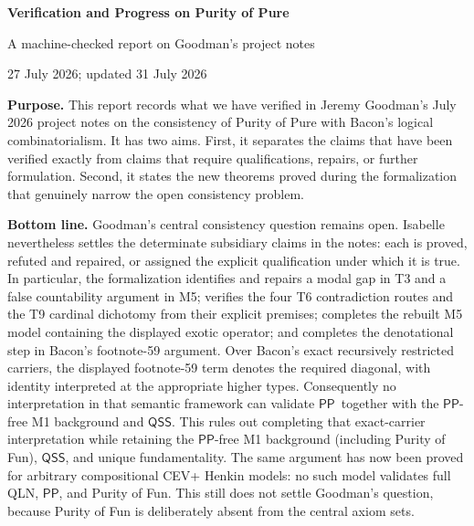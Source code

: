 \documentclass[12pt,leqno]{article}
\theoremstyle{plain}
\theoremstyle{definition}
\newcommand{\PP}{\ensuremath{\mathsf{PP}}}
\newcommand{\QSS}{\ensuremath{\mathsf{QSS}}}
\begin{document}
\begin{center}
{\Large\bfseries Verification and Progress on Purity of Pure\par}
\vspace{4pt}
{\large A machine-checked report on Goodman's project notes\par}
\vspace{8pt}
{\normalsize 27 July 2026; updated 31 July 2026}
\end{center}

\bigskip

\noindent\textbf{Purpose.}
This report records what we have verified in Jeremy Goodman's July 2026
project notes on the consistency of Purity of Pure with Bacon's logical
combinatorialism.  It has two aims.  First, it separates the claims that have
been verified exactly from claims that require qualifications, repairs, or
further formulation.  Second, it states the new theorems proved during the
formalization that genuinely narrow the open consistency problem.

\medskip

\noindent\textbf{Bottom line.}
Goodman's central consistency question remains open.  Isabelle nevertheless
settles the determinate subsidiary claims in the notes: each is proved,
refuted and repaired, or assigned the explicit qualification under which it
is true.  In particular, the formalization identifies and repairs a modal gap
in T3 and a false countability argument in M5; verifies the four T6
contradiction routes and the T9 cardinal dichotomy from their explicit
premises; completes the rebuilt M5 model containing the displayed exotic
operator; and completes the denotational step in Bacon's footnote-59
argument.  Over Bacon's exact recursively restricted carriers, the displayed footnote-59 term
denotes the required diagonal, with identity interpreted at the appropriate
higher types.  Consequently no interpretation in that semantic framework
can validate \PP\ together with the \PP-free M1 background and \QSS.  This
rules out completing that exact-carrier interpretation while retaining the
\PP-free M1 background (including Purity of Fun), \QSS, and unique
fundamentality.  The same argument
has now been proved for arbitrary compositional CEV+ Henkin models: no such
model validates full QLN, \PP, and Purity of Fun.  This still does not settle
Goodman's question, because Purity of Fun is deliberately absent from the
central axiom sets.
\end{document}
